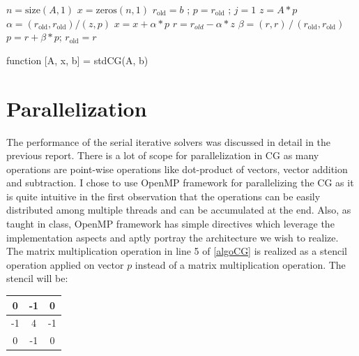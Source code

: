\documentclass{article}
\begin{document}
\begin{spacing}{1.1}
\begin{algorithm}[H]

\begin{algorithmic}[1]

\STATE $n = \text{size}(A,1)$ 
\STATE $x = \text{zeros}(n,1)$
\STATE $r_{\text{old}} = b$ ; $p = r_{\text{old}}$ ; $j = 1$
\STATE $z = A*p$ 
\STATE ${\alpha} = (r_{\text{old}}, r_{\text{old}})/(z, p)$
\STATE $x = x + \alpha * p$ 
\STATE $r = r_{old} - \alpha * z$
\STATE $\beta = (r, r) \, / \, (r_{\text{old}}, r_{\text{old}})$
\STATE $p = r + \beta* p$;
\STATE $r_{\text{old}} = r$
\ENDFOR
\end{algorithmic}
\caption{\label{algoCG} function [A, x, b] = stdCG(A, b)} 
\end{algorithm}


\section{Parallelization}

    The performance of the serial iterative solvers was discussed in detail in the previous report. There is a lot of scope for parallelization in CG as many operations are point-wise operations like dot-product of vectors, vector addition and subtraction. I chose to use OpenMP framework for parallelizing the CG as it is quite intuitive in the first observation that the operations can be easily distributed among multiple threads and can be accumulated at the end. Also, as taught in class, OpenMP framework has simple directives which leverage the implementation aspects and aptly portray the architecture we wish to realize. The matrix multiplication operation in line 5 of \ref{algoCG} is realized as a stencil operation applied on vector $p$ instead of a matrix multiplication operation. The stencil will be:
\begin{tabular}{|c|c|c|}
\hline
0 & -1 & 0\\ \hline
-1 & 4 & -1 \\ \hline
0 & -1 & 0 \\ \hline
\end{tabular}


\end{spacing}
\end{document}
